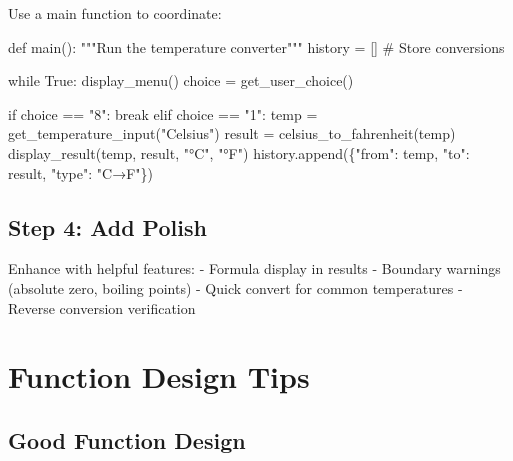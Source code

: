 \documentclass[
  letterpaper,
  DIV=11,
  numbers=noendperiod,
  oneside]{scrreprt}
\newenvironment{Shaded}{}{}
\newcommand{\CommentTok}[1]{\textcolor[rgb]{0.42,0.45,0.49}{#1}}
\newcommand{\ControlFlowTok}[1]{\textcolor[rgb]{0.84,0.23,0.29}{#1}}
\newcommand{\KeywordTok}[1]{\textcolor[rgb]{0.84,0.23,0.29}{#1}}
\newcommand{\NormalTok}[1]{\textcolor[rgb]{0.14,0.16,0.18}{#1}}
\newcommand{\OperatorTok}[1]{\textcolor[rgb]{0.14,0.16,0.18}{#1}}
\newcommand{\StringTok}[1]{\textcolor[rgb]{0.01,0.18,0.38}{#1}}
\newcommand{\VariableTok}[1]{\textcolor[rgb]{0.89,0.38,0.04}{#1}}
\begin{document}
Use a main function to coordinate:

\begin{Shaded}
\begin{Highlighting}[]
\KeywordTok{def}\NormalTok{ main():}
    \CommentTok{"""Run the temperature converter"""}
\NormalTok{    history }\OperatorTok{=}\NormalTok{ []  }\CommentTok{\# Store conversions}
    
    \ControlFlowTok{while} \VariableTok{True}\NormalTok{:}
\NormalTok{        display\_menu()}
\NormalTok{        choice }\OperatorTok{=}\NormalTok{ get\_user\_choice()}
        
        \ControlFlowTok{if}\NormalTok{ choice }\OperatorTok{==} \StringTok{"8"}\NormalTok{:}
            \ControlFlowTok{break}
        \ControlFlowTok{elif}\NormalTok{ choice }\OperatorTok{==} \StringTok{"1"}\NormalTok{:}
\NormalTok{            temp }\OperatorTok{=}\NormalTok{ get\_temperature\_input(}\StringTok{"Celsius"}\NormalTok{)}
\NormalTok{            result }\OperatorTok{=}\NormalTok{ celsius\_to\_fahrenheit(temp)}
\NormalTok{            display\_result(temp, result, }\StringTok{"°C"}\NormalTok{, }\StringTok{"°F"}\NormalTok{)}
\NormalTok{            history.append(\{}\StringTok{"from"}\NormalTok{: temp, }\StringTok{"to"}\NormalTok{: result, }\StringTok{"type"}\NormalTok{: }\StringTok{"C→F"}\NormalTok{\})}
\end{Highlighting}
\end{Shaded}

\subsection{Step 4: Add Polish}\label{step-4-add-polish}

Enhance with helpful features: - Formula display in results - Boundary
warnings (absolute zero, boiling points) - Quick convert for common
temperatures - Reverse conversion verification

\section{Function Design Tips}\label{function-design-tips}

\subsection{Good Function Design}\label{good-function-design}
\end{document}
